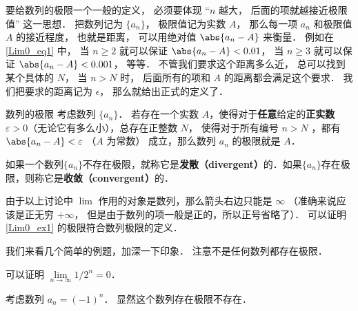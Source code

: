要给数列的极限一个一般的定义， 必须要体现 “$n$ 越大， 后面的项就越接近极限值” 这一思想． 把数列记为 $\{a_n\}$， 极限值记为实数 $A$， 那么每一项 $a_n$ 和极限值 $A$ 的接近程度， 也就是距离， 可以用绝对值 $\abs{a_n - A}$ 来衡量． 例如在\autoref{Lim0_eq1} 中， 当 $n \ge 2$ 就可以保证 $\abs{a_n - A} < 0.01$， 当 $n \ge 3$ 就可以保证 $\abs{a_n - A} < 0.001$， 等等． 不管我们要求这个距离多么近， 总可以找到某个具体的 $N$， 当 $n > N$ 时， 后面所有的项和 $A$ 的距离都会满足这个要求． 我们把要求的距离记为 $\epsilon$， 那么就给出正式的定义了．

\begin{definition}{数列的极限}\label{Lim0_def2}
考虑数列 $\{a_n\}$． 若存在一个实数 $A$，使得对于\textbf{任意}给定的\textbf{正实数} $\varepsilon > 0$（无论它有多么小），总存在正整数 $N$， 使得对于所有编号 $n>N$ ，都有 $\abs{a_n - A} < \varepsilon$ （$A$ 为常数） 成立，那么数列 $a_n$ 的极限就是 $A$．

如果一个数列$\{a_n\}$不存在极限，就称它是\textbf{发散（divergent）}的．如果$\{a_n\}$存在极限，则称它是\textbf{收敛（convergent）}的．
\end{definition}
由于以上讨论中 $\lim$ 作用的对象是数列，那么箭头右边只能是 $\infty$ （准确来说应该是正无穷 $+\infty$， 但是由于数列的项一般是正的，所以正号省略了）． 可以证明\autoref{Lim0_ex1} 的极限符合数列极限的定义．

我们来看几个简单的例题，加深一下印象． 注意不是任何数列都存在极限．

\begin{example}{}
可以证明 $\lim\limits_{n\to\infty}1/2^n = 0$．
\end{example}

\begin{example}{}\label{Lim0_exe1}
考虑数列 $a_n=(-1)^n$． 显然这个数列存在极限不存在．
\end{example}
